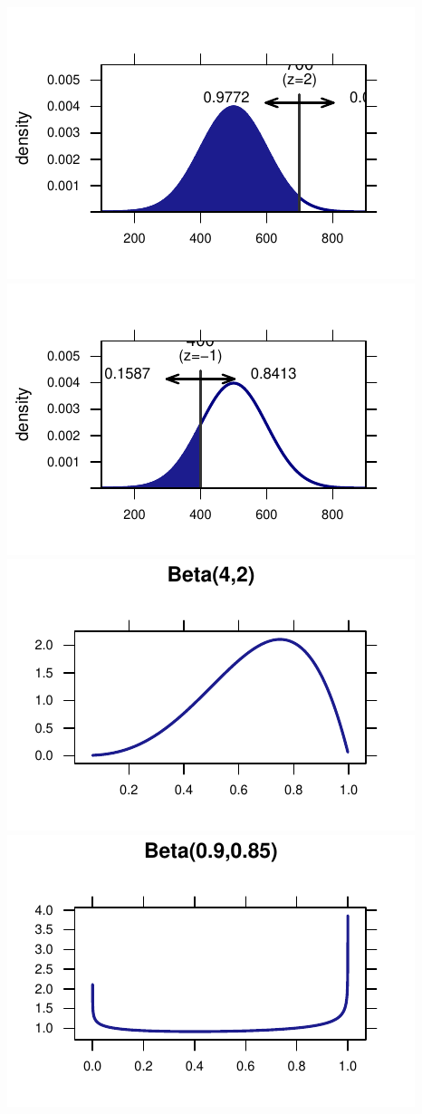 \documentclass[twoside]{book}\usepackage[]{graphicx}\usepackage[]{xcolor}
\makeatletter
\def\maxwidth{ %
  \ifdim\Gin@nat@width>\linewidth
    \linewidth
  \else
    \Gin@nat@width
  \fi
}
\newenvironment{knitrout}{}{} %
\makeatother
\begin{document}
\begin{knitrout}
{\centering \includegraphics[width=\maxwidth]{figures/fig-unnamed-chunk-85-1} 
\includegraphics[width=\maxwidth]{figures/fig-unnamed-chunk-85-2} 
\includegraphics[width=\maxwidth]{figures/fig-unnamed-chunk-85-3} 
\includegraphics[width=\maxwidth]{figures/fig-unnamed-chunk-85-4} 

}
\end{knitrout}
\end{document}
